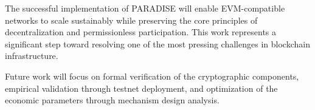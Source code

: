 \documentclass{article}
\begin{document}
The successful implementation of PARADISE will enable EVM-compatible networks to scale sustainably while preserving the core principles of decentralization and permissionless participation. This work represents a significant step toward resolving one of the most pressing challenges in blockchain infrastructure.

Future work will focus on formal verification of the cryptographic components, empirical validation through testnet deployment, and optimization of the economic parameters through mechanism design analysis.




\end{document}
